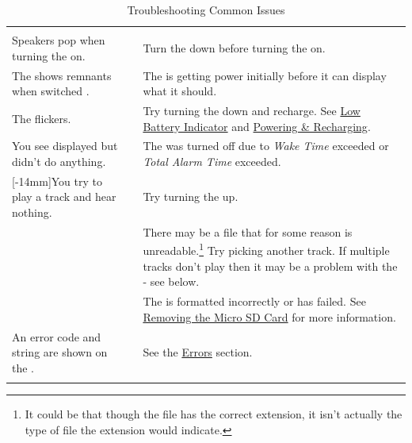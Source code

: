 \begin{longtabu} { X[5,l,m] | X[2,c,m] | X[7,l,m] }
  \thrule

   &  &  \\ \mdrule

  Speakers pop when turning the  on.
    & 
    & Turn the  down before turning the  on. \\ \mrule

  The  shows remnants when switched .
    & 
    & The  is getting power initially before it can display what
      it should. \\ \mrule

  The  flickers.
    & 
    & Try turning the  down and recharge.
      See \hyperref[Low Battery Indicator]{Low Battery Indicator}
      and \hyperref[Powering and Recharging]{Powering \& Recharging}. \\ \mrule

  You see  displayed but didn't do anything.
    & 
    & The  was turned off due to \textit{Wake Time} exceeded or
      \textit{Total Alarm Time} exceeded. \\ \mrule

  \pagebreak
  \mrule

  [-14mm]{\parbox{\linewidth}{You try to play a track and hear nothing.}}
    & 
    & Try turning the  up. \\ 
  & 
    & \parbox{\linewidth}{\par\bigskip There may be a file that for some reason is
      unreadable.\footnote{ It could be that though the file has the correct extension,
      it isn't actually the type of file the extension would indicate.} Try
      picking another track.  If multiple tracks don't play then it may be a
      problem with the  - see below. \par\bigskip} \\ 
  & 
    & The  is formatted incorrectly or has failed.  See
    \hyperref[Removing SD Card]{Removing the Micro SD Card} for more
    information. \\ \mrule

  An error code and string are shown on the .
    & 
    & See the \hyperref[Error Codes]{Errors} section. \\

  \bhrule
\caption{Troubleshooting Common Issues}
\end{longtabu}

